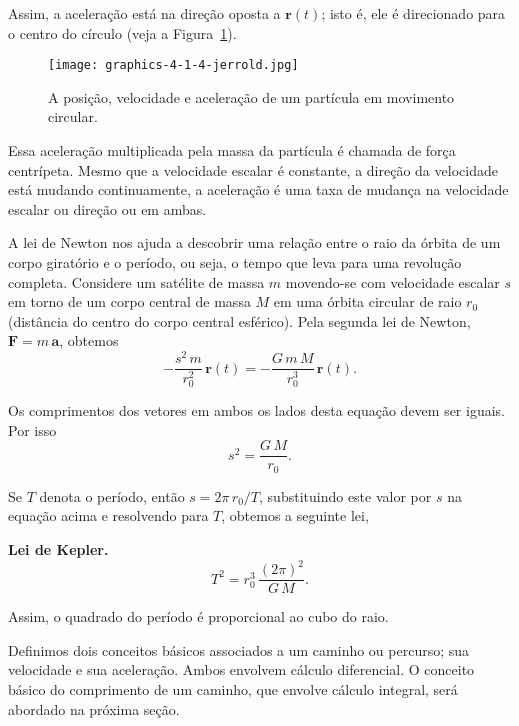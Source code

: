 Assim, a aceleração está na direção oposta a $\mathbf{r}(t)$; isto é, ele é direcionado para o centro do círculo (veja a Figura~\ref{fig:4-1-4-jerrold}).

\begin{figure}[h!]
  \centering
  \texttt{[image: graphics-4-1-4-jerrold.jpg]}
  \caption{A posição, velocidade e aceleração de um partícula em movimento circular.}
  \label{fig:4-1-4-jerrold}
\end{figure}

Essa aceleração multiplicada pela massa da partícula é chamada de \textsf{força centrípeta}. Mesmo que a velocidade escalar é constante, a direção da
velocidade está mudando continuamente, a aceleração é uma taxa de mudança na velocidade escalar ou direção ou em ambas.

A lei de Newton nos ajuda a descobrir uma relação entre o raio da órbita de um corpo giratório e o período, ou seja, o tempo que leva para uma
revolução completa. Considere um satélite de massa $m$ movendo-se com velocidade escalar $s$ em torno de um corpo central de massa $M$ em uma órbita circular de raio $r_{0}$ (distância do centro do corpo central esférico). Pela segunda lei de Newton, $\mathbf{F}= m\, \mathbf{a}$, obtemos
\begin{equation*}
-\frac{s^{2}\, m}{r^{2}_{0}}\, \mathbf{r}(t)= -\dfrac{G\, m\, M}{r_{0}^{3}}\,\mathbf{r}(t).
\end{equation*}

Os comprimentos dos vetores em ambos os lados desta equação devem ser iguais. Por isso
\begin{equation*}
s^{2}= \frac{G\, M}{r_{0}}.
\end{equation*}

Se $T$ denota o período, então $s=2\pi\, r_{0}/T$, substituindo este valor por $s$ na equação acima e resolvendo para $T$, obtemos a seguinte lei,

\noindent\textbf{Lei de Kepler.}
\begin{equation*}
  T^{2}=r_{0}^{3}\,\dfrac{(2\pi)^{2}}{G\, M}.
\end{equation*}

Assim, o quadrado do período é proporcional ao cubo do raio.

Definimos dois conceitos básicos associados a um caminho ou percurso; sua velocidade e sua aceleração. Ambos envolvem cálculo \textsf{diferencial}. O
conceito básico do \textsf{comprimento de um caminho}, que envolve cálculo \textsf{integral}, será abordado na próxima seção.

